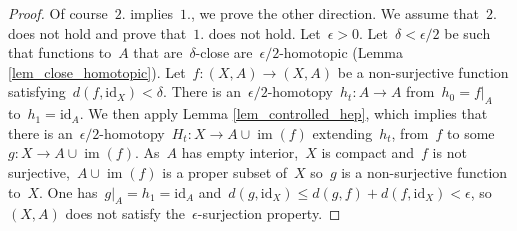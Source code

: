 \documentclass[english,11pt]{article}
\theoremstyle{plain}
\theoremstyle{remark}
\newtheorem{claim}{Claim}[section]
\theoremstyle{definition}
\newcommand{\id}{\mathrm{id}}
\newcommand{\im}{\mathop{\mathrm{im}}}
\begin{document}
\begin{proof}
Of course~$2.$ implies~$1.$, we prove the other direction. We assume that~$2.$ does not hold and prove that~$1.$ does not hold. Let~$\epsilon>0$. Let~$\delta<\epsilon/2$ be such that functions to~$A$ that are~$\delta$-close are~$\epsilon/2$-homotopic (Lemma \ref{lem_close_homotopic}). Let~$f:(X,A)\to (X,A)$ be a non-surjective function satisfying~$d(f,\id_X)<\delta$. There is an~$\epsilon/2$-homotopy~$h_t:A\to A$ from~$h_0=f|_A$ to~$h_1=\id_A$. We then apply Lemma \ref{lem_controlled_hep}, which implies that there is an~$\epsilon/2$-homotopy~$H_t:X\to A\cup \im(f)$ extending~$h_t$, from~$f$ to some~$g:X\to A\cup \im(f)$. As~$A$ has empty interior,~$X$ is compact and~$f$ is not surjective,~$A\cup\im(f)$ is a proper subset of~$X$ so~$g$ is a non-surjective function to~$X$. One has~$g|_A=h_1=\id_A$ and~$d(g,\id_X)\leq d(g,f)+d(f,\id_X)<\epsilon$, so~$(X,A)$ does not satisfy the~$\epsilon$-surjection property.
%
%
%
\end{proof}
\end{document}
